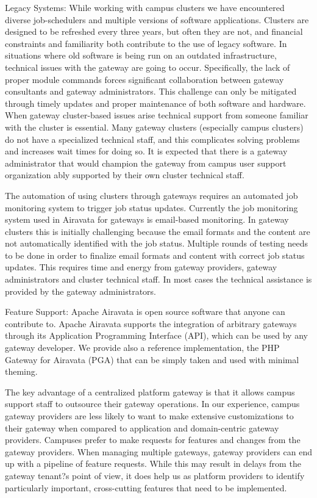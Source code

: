 \documentclass[sigconf]{acmart}
\begin{document}
Legacy Systems: While working with campus clusters we have encountered diverse job-schedulers and multiple versions of software applications. Clusters are designed to be refreshed every three years, but often they are not, and financial constraints and familiarity both contribute to the use of legacy software. In situations where old software is being run on an outdated infrastructure, technical issues with the gateway are going to occur.  Specifically, the lack of proper module commands forces significant collaboration between gateway consultants and gateway administrators. This challenge can only be mitigated through timely updates and proper maintenance of both software and hardware.  When gateway cluster-based issues arise  technical support from someone familiar with the cluster is essential. Many gateway clusters (especially campus clusters) do not have a specialized technical staff, and this complicates solving problems and increases wait times for doing so. It is expected that there is a gateway administrator that would champion the gateway from campus user support organization ably supported by their own cluster technical staff. 

The automation of using clusters through gateways requires an automated job monitoring system to trigger job status updates. Currently the job monitoring system used in Airavata for gateways is email-based monitoring. In gateway clusters this is initially challenging because the email formats and the content are not automatically identified with  the job status. Multiple rounds of testing needs to be done in order to finalize email formats and content with correct job status updates. This requires time and energy from gateway providers, gateway administrators and cluster technical staff. In most cases the technical assistance is provided by the gateway administrators.

Feature Support: Apache Airavata is open source software that anyone can contribute to. Apache Airavata supports the integration of arbitrary gateways through its Application Programming Interface (API), which can be used by any gateway developer. We provide also a reference implementation, the PHP Gateway for Airavata (PGA) that can be simply taken and used with minimal theming. 

The key advantage of a centralized platform gateway is that it allows campus support staff to outsource their gateway operations. In our experience, campus gateway providers are less likely to want to make extensive customizations to their gateway when compared to application and domain-centric gateway providers. Campuses prefer to make requests for features and changes from the gateway providers.  When managing multiple gateways, gateway providers can end up with a pipeline of feature requests.  While this may result in delays from the gateway tenant?s point of view, it does help us as platform providers to identify particularly important, cross-cutting features that need to be implemented. 
\end{document}
